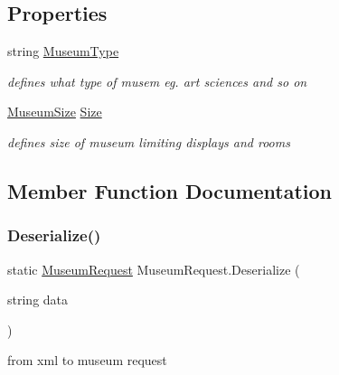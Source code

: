 \subsection*{Properties}
\begin{DoxyCompactItemize}
\item 
string \mbox{\hyperlink{class_museum_request_a55a4ab7c95751f54af3f8ced9d81ba76}{Museum\+Type}}
\begin{DoxyCompactList}\small\item\em defines what type of musem eg. art sciences and so on \end{DoxyCompactList}\item 
\mbox{\hyperlink{_mueseum_request_8cs_a462fa84e99cf703318040e54f14146a2}{Museum\+Size}} \mbox{\hyperlink{class_museum_request_a82207d17f80d3a624e7784ffe21c6f43}{Size}}
\begin{DoxyCompactList}\small\item\em defines size of museum limiting displays and rooms \end{DoxyCompactList}\end{DoxyCompactItemize}


\subsection{Member Function Documentation}
\mbox{\label{class_museum_request_abd551a45744c8387841c20e5ef46d420}} 
\subsubsection{\texorpdfstring{Deserialize()}{Deserialize()}}
{\footnotesize\ttfamily static \mbox{\hyperlink{class_museum_request}{Museum\+Request}} Museum\+Request.\+Deserialize (\begin{DoxyParamCaption}\item[{string}]{data }\end{DoxyParamCaption})\hspace{0.3cm}{\ttfamily [static]}}



from xml to museum request 

